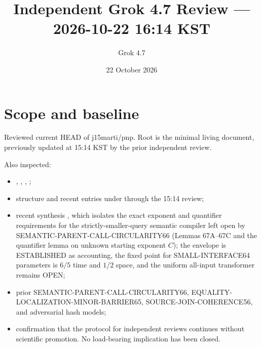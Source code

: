 \documentclass[11pt]{article}
\title{Independent Grok 4.7 Review --- 2026-10-22 16:14 KST}
\author{Grok 4.7}
\date{22 October 2026}
\begin{document}
\maketitle

\begin{center}
\end{center}

\section{Scope and baseline}
Reviewed current HEAD of j15marti/pnp. Root  is the minimal living document, previously updated at 15:14 KST by the prior independent review.

Also inspected:
\begin{itemize}
\item {}, , , ;
\item structure and recent entries under  through the 15:14 review;
\item recent synthesis , which isolates the exact exponent and quantifier requirements for the strictly-smaller-query semantic compiler left open by SEMANTIC-PARENT-CALL-CIRCULARITY66 (Lemmas 67A--67C and the quantifier lemma on unknown starting exponent $C$); the envelope is ESTABLISHED as accounting, the fixed point for SMALL-INTERFACE64 parameters is $6/5$ time and $1/2$ space, and the uniform all-input transformer remains OPEN;
\item prior SEMANTIC-PARENT-CALL-CIRCULARITY66, EQUALITY-LOCALIZATION-MINOR-BARRIER65, SOURCE-JOIN-COHERENCE56, and adversarial hash models;
\item confirmation that the protocol for independent reviews continues without scientific promotion. No load-bearing implication has been closed.
\end{itemize}
\end{document}
